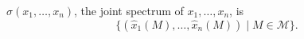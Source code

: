 
$\sigma(x_1, \ldots, x_n)$, the joint spectrum of $x_1, \ldots, x_n$, is
$$\{(\hat{x}_1(M), \ldots, \hat{x}_n(M)) \mid M \in \mathcal{M}\}.$$
